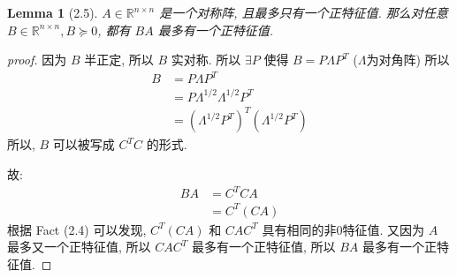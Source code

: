 \documentclass{article}
\newtheorem*{lemma*}{Lemma}
\begin{document}
\begin{lemma*}[2.5]
  $A\in\mathbb{R}^{n\times n}$ 是一个对称阵, 且最多只有一个正特征值.
  那么对任意 $B\in\mathbb{R}^{n\times n}, B\succcurlyeq 0$, 都有 $BA$ 最多有一个正特征值.
\end{lemma*}
\begin{proof}[proof]
  因为 $B$ 半正定, 所以 $B$ 实对称. 所以 $\exists P$ 使得 $B = P\Lambda P^T$
  ($\Lambda$为对角阵) 所以
  \begin{align*}
    B &= P\Lambda P^T \\
      &= P\Lambda^{1/2}\Lambda^{1/2}P^T \\
    &= (\Lambda^{1/2}P^T)^T(\Lambda^{1/2}P^T)
  \end{align*}
  所以, $B$ 可以被写成 $C^TC$ 的形式.

  故:
  \begin{align*}
    BA &= C^TCA \\
    &= C^T(CA)
  \end{align*}
  根据 Fact (2.4) 可以发现, $C^T(CA)$ 和 $CAC^T$ 具有相同的非0特征值.
  又因为 $A$ 最多又一个正特征值, 所以 $CAC^T$ 最多有一个正特征值, 所以 $BA$ 最多有一个正特征值.
\end{proof}
\end{document}
